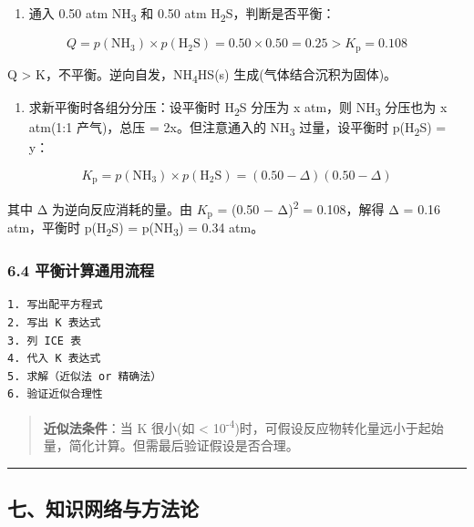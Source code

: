 \documentclass[a4paper,11pt]{ctexart}
\providecommand{\tightlist}{\setlength{\itemsep}{0pt}\setlength{\parskip}{0pt}}
\newcommand{\箭}{\ensuremath{\rightarrow}}
\newcommand{\左箭}{\ensuremath{\leftarrow}}
\newcommand{\上箭}{\ensuremath{\uparrow}}
\newcommand{\下箭}{\ensuremath{\downarrow}}
\newcommand{\衡}{\ensuremath{\rightleftharpoons}}
\newcommand{\双箭}{\ensuremath{\leftrightarrow}}
\newcommand{\约等于}{\ensuremath{\approx}}
\newcommand{\小于等于}{\ensuremath{\leq}}
\newcommand{\大于等于}{\ensuremath{\geq}}
\newcommand{\不等于}{\ensuremath{\neq}}
\newcommand{\西格马}{\ensuremath{\sigma}}
\newcommand{\派}{\ensuremath{\pi}}
\begin{document}
\begin{enumerate}
\def\labelenumi{(\alph{enumi})}
\tightlist
\item
  通入 0.50 atm NH\textsubscript{3} 和 0.50 atm H\textsubscript{2}S，判断是否平衡：
\end{enumerate}

\[
Q = p(\mathrm{NH_3}) \times p(\mathrm{H_2S}) = 0.50 \times 0.50 = 0.25 > K_{\mathrm p} = 0.108
\]

Q \textgreater{} K，不平衡。逆向自发，NH\textsubscript{4}HS(s) 生成(气体结合沉积为固体)。

\begin{enumerate}
\def\labelenumi{(\alph{enumi})}
\setcounter{enumi}{1}
\tightlist
\item
  求新平衡时各组分分压：设平衡时 H\textsubscript{2}S 分压为 x atm，则 NH\textsubscript{3} 分压也为 x atm(1:1 产气)，总压 = 2x。但注意通入的 NH\textsubscript{3} 过量，设平衡时 p(H\textsubscript{2}S) = y：
\end{enumerate}

\[
K_{\mathrm p} = p(\mathrm{NH_3}) \times p(\mathrm{H_2S}) = (0.50 - \Delta)(0.50 - \Delta)
\]

其中 Δ 为逆向反应消耗的量。由 \(K_{\mathrm p}\) = (0.50 − Δ)\textsuperscript{2} = 0.108，解得 Δ = 0.16 atm，平衡时 p(H\textsubscript{2}S) = p(NH\textsubscript{3}) = 0.34 atm。

\subsubsection{6.4 平衡计算通用流程}\label{ux5e73ux8861ux8ba1ux7b97ux901aux7528ux6d41ux7a0b}

\begin{verbatim}
1. 写出配平方程式
2. 写出 K 表达式
3. 列 ICE 表
4. 代入 K 表达式
5. 求解（近似法 or 精确法）
6. 验证近似合理性
\end{verbatim}

\begin{quote}
\textbf{近似法条件}：当 K 很小(如 \textless{} 10\textsuperscript{-4})时，可假设反应物转化量远小于起始量，简化计算。但需最后验证假设是否合理。
\end{quote}

\begin{center}\rule{0.5\linewidth}{0.5pt}\end{center}

\subsection{七、知识网络与方法论}\label{ux4e03ux77e5ux8bc6ux7f51ux7edcux4e0eux65b9ux6cd5ux8bba}
\end{document}

